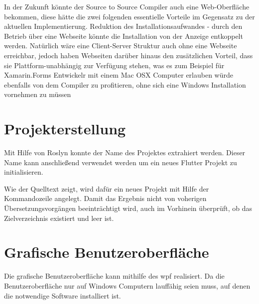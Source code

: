 In der Zukunft könnte der Source to Source Compiler auch eine Web-Oberfläche bekommen,  diese hätte die zwei folgenden essentielle Vorteile im Gegensatz zu der aktuellen Implementierung.  Reduktion des Installationsaufwandes - durch den Betrieb über eine Webseite könnte die Installation von der Anzeige entkoppelt werden.  Natürlich wäre eine Client-Server Struktur auch ohne eine Webseite erreichbar,  jedoch haben Webseiten darüber hinaus den zusätzlichen Vorteil,  dass sie Plattform-unabhängig zur Verfügung stehen,  was es zum Beispiel für Xamarin.Forms Entwickelr mit einem Mac OSX Computer erlauben würde ebenfalls von dem Compiler zu profitieren, ohne sich eine Windows Installation vornehmen zu müssen

\section{Projekterstellung}
Mit Hilfe von Roslyn konnte der Name des Projektes extrahiert werden.  Dieser Name kann anschließend verwendet werden um ein neues Flutter Projekt zu initialisieren.  

Wie der Quelltext zeigt,  wird dafür ein neues Projekt mit Hilfe der Kommandozeile angelegt.  Damit das Ergebnis nicht von voherigen Übersetzungsvorgängen beeinträchtigt wird,  auch im Vorhinein überprüft,  ob das Zielverzeichnis existiert und leer ist. 


\section{Grafische Benutzeroberfläche}
Die grafische Benutzeroberfläche kann mithilfe des \ac{wpf} realisiert.  Da die Benutzeroberfläche nur auf Windows Computern lauffähig seien muss,  auf denen die notwendige Software installiert ist. 


